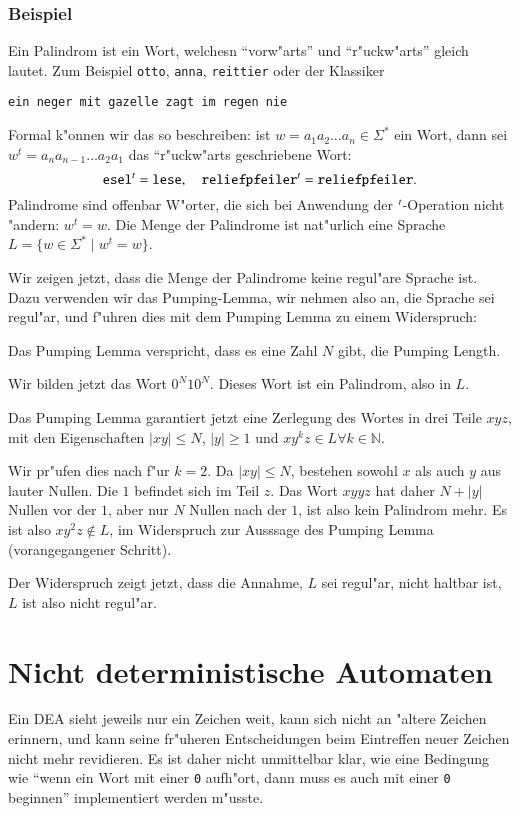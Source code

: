 \subsubsection{Beispiel}
Ein Palindrom ist ein Wort, welchesn ``vorw"arts'' und ``r"uckw"arts''
gleich lautet. Zum Beispiel {\tt otto}, {\tt anna}, {\tt reittier} oder der
Klassiker
\begin{center}
{\tt ein neger mit gazelle zagt im regen nie}
\end{center}
Formal k"onnen wir das so beschreiben: ist $w=a_1a_2\dots a_n\in\Sigma^*$
ein Wort, dann sei $w^t=a_na_{n-1}\dots a_2a_1$ das ``r"uckw"arts
geschriebene Wort:
\[
{\tt esel}^t={\tt lese},\quad {\tt reliefpfeiler}^t={\tt reliefpfeiler}.
\]
Palindrome sind offenbar W"orter, die sich bei Anwendung der
$\mathstrut^t$-Operation nicht "andern: $w^t=w$. Die Menge der Palindrome
ist nat"urlich eine Sprache $L=\{w\in\Sigma^*\;|\;w^t=w\}$. 

Wir zeigen jetzt, dass die Menge der Palindrome keine regul"are Sprache ist.
Dazu verwenden wir das Pumping-Lemma, wir nehmen also an, die Sprache
sei regul"ar, und f"uhren dies mit dem Pumping Lemma zu einem
Widerspruch:
\begin{compactenum}
\item Das Pumping Lemma verspricht, dass es eine Zahl $N$ gibt, die
Pumping Length.
\item Wir bilden jetzt das Wort $0^N10^N$. Dieses Wort ist ein Palindrom,
also in $L$.
\item Das Pumping Lemma garantiert jetzt eine Zerlegung des Wortes
in drei Teile $xyz$, mit den Eigenschaften $|xy|\le N$, $|y|\ge 1$ und
$xy^kz\in L\forall k\in\mathbb N$.
\item Wir pr"ufen dies nach f"ur $k=2$. Da $|xy|\le N$, bestehen
sowohl $x$ als auch $y$ aus lauter Nullen. Die $1$ befindet sich im Teil $z$.
Das Wort $xyyz$ hat daher $N+|y|$ Nullen vor der $1$, aber nur $N$ Nullen
nach der $1$, ist also kein Palindrom mehr. Es ist also $xy^2z\not\in L$,
im Widerspruch zur Ausssage des Pumping Lemma (vorangegangener Schritt).
\end{compactenum}
Der Widerspruch zeigt jetzt, dass die Annahme, $L$ sei regul"ar, nicht
haltbar ist, $L$ ist also nicht regul"ar.

\section{Nicht deterministische Automaten}
Ein DEA sieht jeweils nur ein Zeichen weit, kann sich nicht an "altere
Zeichen erinnern, und kann seine fr"uheren Entscheidungen beim Eintreffen
neuer Zeichen nicht mehr revidieren. Es ist daher nicht unmittelbar klar,
wie eine Bedingung wie ``wenn ein
Wort mit einer {\tt 0} aufh"ort, dann muss es auch mit einer {\tt 0}
beginnen'' implementiert werden m"usste.

